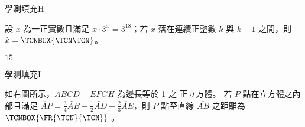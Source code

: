 \begin{QUESTIONS}
\begin{QUESTION}
\begin{QSOLLIST}
        \end{QSOLLIST}
        \begin{QEMPTYSPACE}
        \end{QEMPTYSPACE}
    \end{QUESTION}
    \begin{QUESTION}
        \begin{ExamInfo}{94}{學測}{填充}{H}
        \end{ExamInfo}
        \begin{ExamAnsRateInfo}{32}{66}{25}{5}
        \end{ExamAnsRateInfo}
        \begin{QBODY}
            設 $x$ 為一正實數且滿足 $x\cdot 3^x =3^{18}$；若 $x$ 落在連續正整數 $k$ 與 $k+1$ 之間，則$k= \TCNBOX{\TCN\TCN}$。
        \end{QBODY}
        \begin{QFROMS}
        \end{QFROMS}
        \begin{QTAGS}\end{QTAGS}
        \begin{QANS}
            $15$
        \end{QANS}
        \begin{QSOLLIST}
        \end{QSOLLIST}
        \begin{QEMPTYSPACE}
        \end{QEMPTYSPACE}
    \end{QUESTION}
    \begin{QUESTION}
        \begin{ExamInfo}{94}{學測}{填充}{I}
        \end{ExamInfo}
        \begin{ExamAnsRateInfo}{26}{63}{13}{2}
        \end{ExamAnsRateInfo}
        \begin{QBODY}
            如右圖所示，$ABCD-EFGH$ 為邊長等於 1 之 正立方體。
			若 $P$ 點在立方體之內部且滿足 
			$\lvec{AP} =\frac{3}{4} \lvec{AB} +\frac{1}{2} \lvec{AD} +\frac{2}{3} \lvec{AE}$，則 $P$ 點至直線
			$\overline{AB}$ 之距離為 
			$\TCNBOX{\FR{\TCN}{\TCN}}$ 。
\end{QBODY}
\end{QUESTION}
\end{QUESTIONS}
